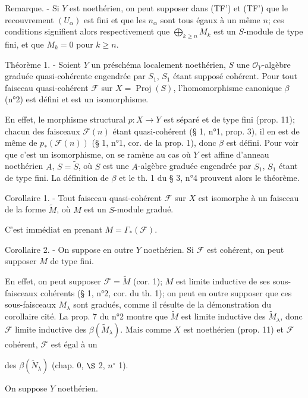 Remarque. - Si $Y$ est noethérien, on peut supposer dans (TF') et (TF') que le recouvrement $(U_\alpha)$ est fini et que les $n_\alpha$ sont tous égaux à un même $n$; ces conditions signifient alors respectivement que $\bigoplus_{k \ge n} M_k$ est un $S$-module de type fini, et que $M_k = 0$ pour $k \ge n$.

Théorème 1. - Soient $Y$ un préschéma localement noethérien, $S$ une $\mathcal{O}_Y$-algèbre graduée quasi-cohérente engendrée par $S_1$, $S_1$ étant supposé cohérent. Pour tout faisceau quasi-cohérent $\mathcal{F}$ sur $X = \operatorname{Proj}(S)$, l'homomorphisme canonique $\beta$ (n°2) est défini et est un isomorphisme.

En effet, le morphisme structural $p : X \to Y$ est séparé et de type fini (prop. 11); chacun des faisceaux $\mathcal{F}(n)$ étant quasi-cohérent (§ 1, n°1, prop. 3), il en est de même de $p_*(\mathcal{F}(n))$ (§ 1, n°1, cor. de la prop. 1), donc $\beta$ est défini. Pour voir que c'est un isomorphisme, on se ramène au cas où $Y$ est affine d'anneau noethérien $A$, $S = \tilde{S}$, où $S$ est une $A$-algèbre graduée engendrée par $S_1$, $S_1$ étant de type fini. La définition de $\beta$ et le th. 1 du § 3, n°4 prouvent alors le théorème.

Corollaire 1. - Tout faisceau quasi-cohérent $\mathcal{F}$ sur $X$ est isomorphe à un faisceau de la forme $\tilde{M}$, où $M$ est un $S$-module gradué.

C'est immédiat en prenant $M = \Gamma_*(\mathcal{F})$.

Corollaire 2. - On suppose en outre $Y$ noethérien. Si $\mathcal{F}$ est cohérent, on peut supposer $M$ de type fini.

En effet, on peut supposer $\mathcal{F} = \tilde{M}$ (cor. 1); $M$ est limite inductive de ses sous-faisceaux cohérents (§ 1, n°2, cor. du th. 1); on peut en outre supposer que ces sous-faisceaux $M_\lambda$ sont gradués, comme il résulte de la démonstration du corollaire cité. La prop. 7 du n°2 montre que $\tilde{M}$ est limite inductive des $\tilde{M}_\lambda$, donc $\mathcal{F}$ limite inductive des $\beta(\tilde{M}_\lambda)$. Mais comme $X$ est noethérien (prop. 11) et $\mathcal{F}$ cohérent, $\mathcal{F}$ est égal à un

\newpage


des $\beta(\tilde{N}_\lambda)$ (chap. 0, $\S$ 2, $n^\circ$ 1).

On suppose $Y$ noethérien.

